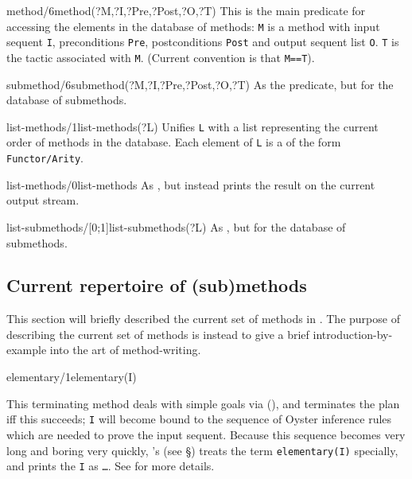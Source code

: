 \begin{predicate}{method/6}{method(?M,?I,?Pre,?Post,?O,?T)}%
This is the main predicate for accessing the elements in the database
of methods:
{\tt M} is a method with input sequent {\tt I}, preconditions {\tt Pre},
postconditions {\tt Post} and output sequent list {\tt O}. {\tt T} is the
tactic associated with {\tt M}. (Current convention is that {\tt M==T}).
\end{predicate}

\begin{predicate}{submethod/6}{submethod(?M,?I,?Pre,?Post,?O,?T)}%
As the  predicate, but for the database of submethods.
\end{predicate}

\begin{predicate}{list-methods/1}{list-methods(?L)}%
Unifies {\tt L} with a list representing the current order of methods
in the database. Each element of {\tt L} is a 
of the form {\tt Functor/Arity}.
\end{predicate}

\begin{predicate}{list-methods/0}{list-methods}%
As , but instead prints the result on the current
output stream.
\end{predicate}

\begin{predicate}{list-submethods/[0;1]}{list-submethods(?L)}%
As , but for the database of submethods.
\end{predicate}

\subsection {Current repertoire of (sub)methods}
\label{repertoire}


This section will briefly described the current set of methods in
\clam. The purpose of describing the current set of methods is instead
to give a brief introduction-by-example into the art of
method-writing.

\begin{method}{elementary/1}{elementary(I)}%
{\tiny
}

This terminating method deals with simple goals via
(), and terminates the plan iff this succeeds; {\tt I}
will become bound to the sequence of Oyster inference rules which are
needed to prove the input sequent. Because this sequence becomes very
long and boring very quickly, {\clam}'s  (see
\S{}) treats the term {\tt elementary(I)}
specially, and prints the {\tt I} as {\tt \ldots}.  See
 for more details.
\end{method}

